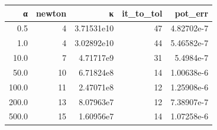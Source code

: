 \begin{tabular}{rrrrr}
  \toprule
  \textbf{α} & \textbf{newton} & \textbf{κ} & \textbf{it\_to\_tol} & \textbf{pot\_err} \\
  \midrule
  0.5 & 4 & 3.71531e10 & 47 & 4.82702e-7 \\
  1.0 & 4 & 3.02892e10 & 44 & 5.46582e-7 \\
  10.0 & 7 & 4.71717e9 & 31 & 5.4984e-7 \\
  50.0 & 10 & 6.71824e8 & 14 & 1.00638e-6 \\
  100.0 & 11 & 2.47071e8 & 12 & 1.25908e-6 \\
  200.0 & 13 & 8.07963e7 & 12 & 7.38907e-7 \\
  500.0 & 15 & 1.60956e7 & 14 & 1.07258e-6 \\
  \bottomrule
\end{tabular}

